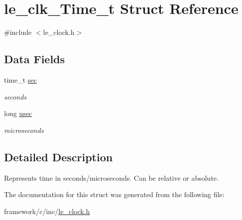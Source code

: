 \hypertarget{structle__clk___time__t}{}\section{le\+\_\+clk\+\_\+\+Time\+\_\+t Struct Reference}
\label{structle__clk___time__t}


{\ttfamily \#include $<$le\+\_\+clock.\+h$>$}

\subsection*{Data Fields}
\begin{DoxyCompactItemize}
\item 
\hypertarget{structle__clk___time__t_ae28e527dbd551b3537edc1737611782f}{}time\+\_\+t \hyperlink{structle__clk___time__t_ae28e527dbd551b3537edc1737611782f}{sec}\label{structle__clk___time__t_ae28e527dbd551b3537edc1737611782f}

\begin{DoxyCompactList}\small\item\em seconds \end{DoxyCompactList}\item 
\hypertarget{structle__clk___time__t_a8324bdde9199a09a47489a3f246f184c}{}long \hyperlink{structle__clk___time__t_a8324bdde9199a09a47489a3f246f184c}{usec}\label{structle__clk___time__t_a8324bdde9199a09a47489a3f246f184c}

\begin{DoxyCompactList}\small\item\em microseconds \end{DoxyCompactList}\end{DoxyCompactItemize}


\subsection{Detailed Description}
Represents time in seconds/microseconds. Can be relative or absolute. 

The documentation for this struct was generated from the following file\+:\begin{DoxyCompactItemize}
\item 
framework/c/inc/\hyperlink{le__clock_8h}{le\+\_\+clock.\+h}\end{DoxyCompactItemize}
